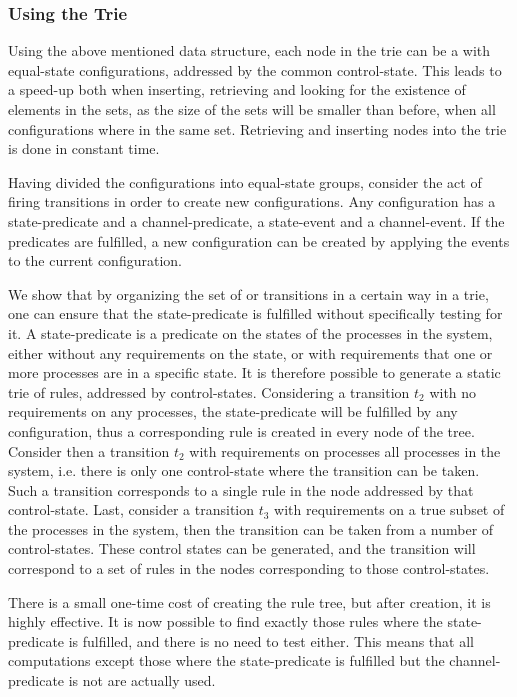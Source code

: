 \subsubsection{Using the Trie}
Using the above mentioned data structure, each node in the trie can be a  with equal-state configurations, addressed by the common control-state. This leads to a speed-up both when inserting, retrieving and looking for the existence of elements in the sets, as the size of the sets will be smaller than before, when all configurations where in the same set. Retrieving and inserting nodes into the trie is done in constant time.

Having divided the configurations into equal-state groups, consider the act of firing transitions in order to create new configurations. Any configuration has a state-predicate and a channel-predicate, a state-event and a channel-event. If the predicates are fulfilled, a new configuration can be created by applying the events to the current configuration.

We show that by organizing the set of  or transitions in a certain way in a trie, one can ensure that the state-predicate is fulfilled without specifically testing for it. A state-predicate is a predicate on the states of the processes in the system, either without any requirements on the state, or with requirements that one or more processes are in a specific state. It is therefore possible to generate a static trie of rules, addressed by control-states. Considering a transition $t_2$ with no requirements on any processes, the state-predicate will be fulfilled by any configuration, thus a corresponding rule is created in every node of the tree. Consider then a transition $t_2$ with requirements on processes all processes in the system, i.e. there is only one control-state where the transition can be taken. Such a transition corresponds to a single rule in the node addressed by that control-state. Last, consider a transition $t_3$ with requirements on a true subset of the processes in the system, then the transition can be taken from a number of control-states. These control states can be generated, and the transition will correspond to a set of rules in the nodes corresponding to those control-states.

There is a small one-time cost of creating the rule tree, but after creation, it is highly effective. It is now possible to find exactly those rules where the state-predicate is fulfilled, and there is no need to test either. This means that all computations except those where the state-predicate is fulfilled but the channel-predicate is not are actually used.

